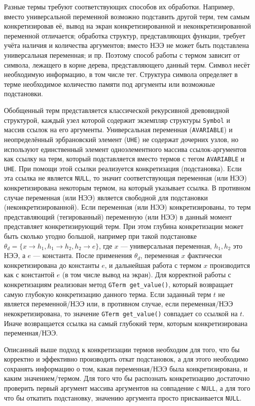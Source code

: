 Разные термы требуют соответствующих способов их обработки. Например, вместо универсальной переменной возможно подставить другой терм, тем самым конкретизировав её, вывод на экран конкретизированной и неконкретизированной переменной отличается; обработка  структур, представляющих функции, требует учёта наличия и количества аргументов; вместо НЭЭ не может быть подставлена универсальная переменная; и пр. Поэтому способ работы с термом зависит от символа, лежащего в корне дерева, представляющего данный терм. Символ несёт необходимую информацию, в том числе тег. Структура символа определяет в терме необходимое количество памяти под аргументы или возможные подстановки.

Обобщенный терм представляется классической рекурсивной древовидной структурой, каждый узел которой содержит экземпляр структуры \texttt{Symbol} и массив ссылок на его аргументы. Универсальная переменная (\texttt{AVARIABLE}) и неопределённый эрбрановский элемент (\texttt{UHE}) не содержат дочерних узлов, но используют единственный элемент одноэлементного массива ссылок-аргументов как ссылку на терм, который подставляется вместо термов с тегом \texttt{AVARIABLE} и \texttt{UHE}. При помощи этой ссылки реализуется конкретизация (подстановка). Если эта ссылка не является \texttt{NULL}, то значит соответствующая переменная (или НЭЭ) конкретизирована некоторым термом, на который указывает ссылка. В противном случае переменная (или НЭЭ) является свободной для подстановки (неконкретизированной). Если переменная (или НЭЭ) конкретизированы, то терм представляющий (тегированный) переменную (или НЭЭ) в данный момент представляет конкретизирующий терм. При этом глубина конкретизации может быть сколько угодно большой, например при такой подстановке ${\theta}_d = \{x \rightarrow h_1, h_1 \rightarrow h_2, h_2 \rightarrow e \}$, где $x$ --- универсальная переменная, $h_1, h_2$ это НЭЭ, а $e$ --- константа. После применения ${\theta}_d$, переменная $x$ фактически конкретизирована до константы $e$, и дальнейшая работа с термом $x$ производится как с константой $e$ (в том числе вывод на экран). Для корректной работы с конкретизациям реализован метод {\tt GTerm get\_value()}, который возвращает самую глубокую конкретизацию данного терма. Если заданный терм $t$ не является переменной/НЭЭ или, в противном случае, если переменная/НЭЭ некокретизирована, то значение \texttt{GTerm get\_value()} совпадает со ссылкой на $t$. Иначе возвращается ссылка на самый глубокий терм, которым конкретизирована переменная/НЭЭ.

Описанный выше подход к конкретизации термов необходим для того, что бы корректно и эффективно производить откат подстановок, а для этого необходимо сохранять информацию о том, какая переменная/НЭЭ была конкретизирована, и каким значением/термом. Для того что бы распознать конкретизацию достаточно проверить первый аргумент массива аргументов на совпадение с \texttt{NULL}, а для того что бы откатить подстановку, значению аргумента просто присваивается \texttt{NULL}.

